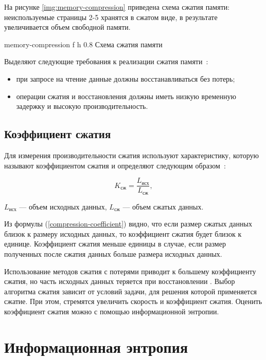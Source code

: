 На рисунке \ref{img:memory-compression} приведена схема сжатия памяти: неиспользуемые страницы 2-5 хранятся в сжатом виде, в результате увеличивается объем свободной памяти.

    {memory-compression}
    {f}
    {h}
    {0.8\textwidth}
    {Схема сжатия памяти}

Выделяют следующие требования к реализации сжатия памяти~\cite{compression-requirements}:

\begin{itemize}
	\item при запросе на чтение данные должны восстанавливаться без потерь;
	\item операции сжатия и восстановления должны иметь низкую временную задержку и высокую производительность.
\end{itemize}

\subsection{Коэффициент сжатия}

Для измерения производительности сжатия используют характеристику, которую называют коэффициентом сжатия и определяют следующим образом~\cite{compression-coefficient}:

\begin{equation}\label{compression-coefficient}
	K_{\text{сж}} = \frac{L_{\text{исх}}}{L_{\text{сж}}},
\end{equation}

 $L_{\text{исх}}$ --- объем исходных данных, $L_{\text{сж}}$ --- объем сжатых данных.

Из формулы (\ref{compression-coefficient}) видно, что если размер сжатых данных близок к размеру исходных данных, то коэффициент сжатия будет близок к единице. Коэффициент сжатия меньше единицы в случае, если размер полученных после сжатия данных больше размера исходных данных.

Использование методов сжатия с потерями приводит к большему коэффициенту сжатия, но часть исходных данных теряется при восстановлении \cite{compression-definition}. Выбор алгоритма сжатия зависит от условий задачи, для решения которой применяется сжатие. При этом, стремятся увеличить скорость и коэффициент сжатия. Оценить коэффициент сжатия можно с помощью информационной энтропии.

\section{Информационная энтропия}\label{ientropy}

